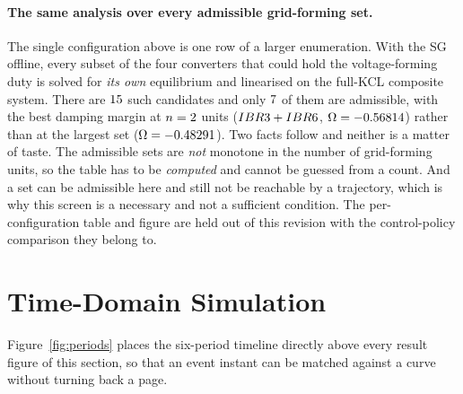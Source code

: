 \documentclass[12pt,a4paper]{article}
\theoremstyle{remark}
\begin{document}
\paragraph{The same analysis over every admissible grid-forming set.}
The single configuration above is one row of a larger enumeration. With the SG
offline, every subset of the four converters that could hold the voltage-forming
duty is solved for \emph{its own} equilibrium and linearised on the full-KCL
composite system. There are $15$ such candidates and only $7$ of
them are admissible, with the best damping margin at $n=2$ units
($IBR3+IBR6$, $\Omega=-0.56814$) rather than at the largest set
($\Omega=-0.48291$). Two facts follow and neither is a matter of taste. The
admissible sets are \emph{not} monotone in the number of grid-forming units, so
the table has to be \emph{computed} and cannot be guessed from a count. And a set
can be admissible here and still not be reachable by a trajectory, which is why
this screen is a necessary and not a sufficient condition. The per-configuration
table and figure are held out of this revision with the control-policy comparison
they belong to.

\section{Time-Domain Simulation}\label{sec:transient}
Figure~\ref{fig:periods} places the six-period timeline directly above every
result figure of this section, so that an event instant can be matched against a
curve without turning back a page.
\end{document}
